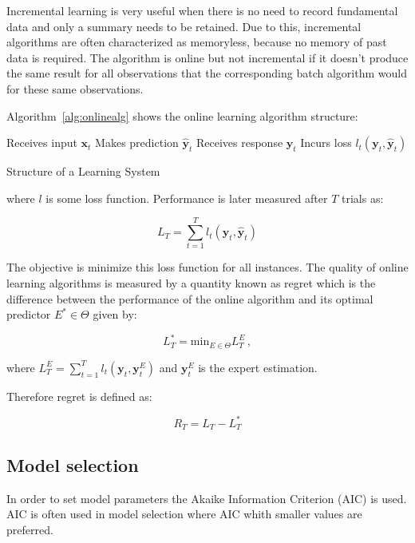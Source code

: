 Incremental learning is very useful when there is no need to record fundamental
data and only a summary needs to be retained. Due to this, incremental
algorithms are often characterized as memoryless, because no memory of past data
is required.  The algorithm is online but not incremental if it doesn't produce
the same result for all observations that the corresponding batch algorithm
would for these same observations.

Algorithm~\ref{alg:onlinealg} shows the online learning algorithm structure:

\begin{algorithm}[ht]
\begin{algorithmic}[1]
    \STATE Receives input $\mathbf{x}_t$
    \STATE Makes prediction $\mathbf{\hat{y}}_t$
    \STATE Receives response $\mathbf{y}_t$
    \STATE Incurs loss $l_t(\mathbf{y}_t,\mathbf{\hat{y}}_t)$
\end{algorithmic}
\caption{Structure of a Learning System}
\label{alg:onlinealg}
\end{algorithm}

\noindent where $l$ is some loss function. Performance is later measured after
$T$ trials as:

\begin{equation*}
L_T = \sum_{t=1}^T l_t(\mathbf{y}_t,\mathbf{\hat{y}}_t)
\end{equation*}

The objective is minimize this loss function for all instances.
The quality of online learning algorithms is measured by a quantity known as
regret which is the difference between the performance of the online algorithm
and its optimal predictor $E^* \in \Theta$ given by:

\begin{equation*}
L^*_T= \text{min}_{E \in \Theta} L_T^E \, ,
\end{equation*}

\noindent where $L_T^E = \sum_{t=1}^T
l_t(\mathbf{y}_t,\mathbf{y}^E_t)$ and $\mathbf{y}^E_t$ is the expert estimation. 

Therefore regret is defined as:

\begin{equation*}
R_T = L_T - L^*_T
\end{equation*}


\subsection{Model selection}
In order to set model parameters the Akaike Information Criterion (AIC) is
used. AIC is often used in model selection where AIC whith smaller values are
preferred.

